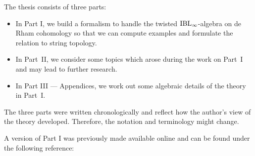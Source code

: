 \documentclass[\MainFolder/Text.tex]{subfiles}
\begin{document}

The thesis consists of three parts:
\begin{itemize}
 \item In Part I, we build a formalism to handle the twisted $\mathrm{IBL}_\infty$-algebra on de Rham cohomology so that we can compute examples and formulate the relation to string topology.
 \item In Part~II, we consider some topics which arose during the work on Part~I and may lead to further research.
 \item In Part III --- Appendices, we work out some algebraic details of the theory in Part~I.
\end{itemize}
The three parts were written chronologically and reflect how the author's view of the theory developed. Therefore, the notation and terminology might change.

A version of Part I was previously made available online and can be found under the following reference: 
\begin{center}
\end{center}
\end{document}

